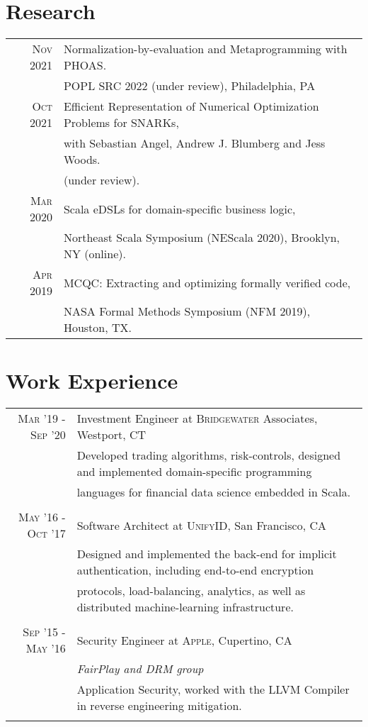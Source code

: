 \documentclass[lettersize,11pt]{article}
\begin{document}
\section{Research}
\begin{tabular}{rl}
    \textsc{Nov} 2021 & Normalization-by-evaluation and Metaprogramming with PHOAS.\\
                      & POPL SRC 2022 (under review), Philadelphia, PA  \\
    \textsc{Oct} 2021 & Efficient Representation of Numerical Optimization Problems for SNARKs, \\
                      & with Sebastian Angel, Andrew J. Blumberg and Jess Woods. \\
                      & (under review).  \\
    \textsc{Mar} 2020 & Scala eDSLs for domain-specific business logic, \\
                      & Northeast Scala Symposium (NEScala 2020), Brooklyn, NY (online). \\
    \textsc{Apr} 2019 & MCQC: Extracting and optimizing formally verified code, \\
                      & NASA Formal Methods Symposium (NFM 2019), Houston, TX. \\
\end{tabular}

\section{Work Experience}
\begin{tabular}{rl}
\textsc{Mar} '19 - \textsc{Sep} '20 & Investment Engineer at \textsc{Bridgewater} Associates, Westport, CT\\
&\footnotesize{Developed trading algorithms, risk-controls, designed and implemented domain-specific programming}\\
&\footnotesize{languages for financial data science embedded in Scala.}\\\multicolumn{2}{c}{}\\
\textsc{May} '16 - \textsc{Oct} '17 & Software Architect at \textsc{UnifyID}, San Francisco, CA\\
&\footnotesize{Designed and implemented the back-end for implicit authentication, including end-to-end encryption}\\
&\footnotesize{protocols, load-balancing, analytics, as well as distributed machine-learning infrastructure.}\\\multicolumn{2}{c}{}\\
\textsc{Sep} '15 - \textsc{May} '16 & Security Engineer at \textsc{Apple}, Cupertino, CA \\&\emph{FairPlay and DRM group}\\
&\footnotesize{Application Security, worked with the LLVM Compiler in reverse engineering mitigation.}\\\multicolumn{2}{c}{}\\
\end{tabular}
\end{document}
